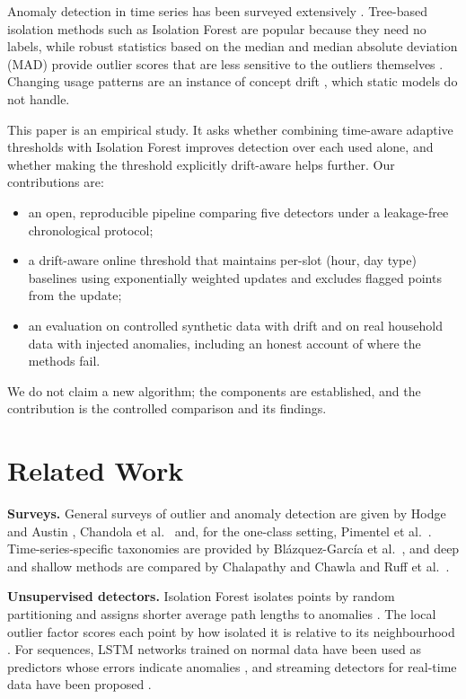 \documentclass[conference]{IEEEtran}
\begin{document}
Anomaly detection in time series has been surveyed extensively \cite{chandola2009,blazquez2021}. Tree-based isolation methods such as Isolation Forest \cite{liu2008} are popular because they need no labels, while robust statistics based on the median and median absolute deviation (MAD) provide outlier scores that are less sensitive to the outliers themselves \cite{leys2013}. Changing usage patterns are an instance of concept drift \cite{gama2014}, which static models do not handle.

This paper is an empirical study. It asks whether combining time-aware adaptive thresholds with Isolation Forest improves detection over each used alone, and whether making the threshold explicitly drift-aware helps further. Our contributions are:
\begin{itemize}
\item an open, reproducible pipeline comparing five detectors under a leakage-free chronological protocol;
\item a drift-aware online threshold that maintains per-slot (hour, day type) baselines using exponentially weighted updates and excludes flagged points from the update;
\item an evaluation on controlled synthetic data with drift and on real household data with injected anomalies, including an honest account of where the methods fail.
\end{itemize}
We do not claim a new algorithm; the components are established, and the contribution is the controlled comparison and its findings.

\section{Related Work}
\textbf{Surveys.} General surveys of outlier and anomaly detection are given by Hodge and Austin \cite{hodge2004}, Chandola et al.\ \cite{chandola2009} and, for the one-class setting, Pimentel et al.\ \cite{pimentel2014}. Time-series-specific taxonomies are provided by Bl\'azquez-Garc\'ia et al.\ \cite{blazquez2021}, and deep and shallow methods are compared by Chalapathy and Chawla \cite{chalapathy2019} and Ruff et al.\ \cite{ruff2021}.

\textbf{Unsupervised detectors.} Isolation Forest isolates points by random partitioning and assigns shorter average path lengths to anomalies \cite{liu2008,liu2012}. The local outlier factor scores each point by how isolated it is relative to its neighbourhood \cite{breunig2000}. For sequences, LSTM networks trained on normal data have been used as predictors whose errors indicate anomalies \cite{malhotra2015}, and streaming detectors for real-time data have been proposed \cite{ahmad2017}.
\end{document}

